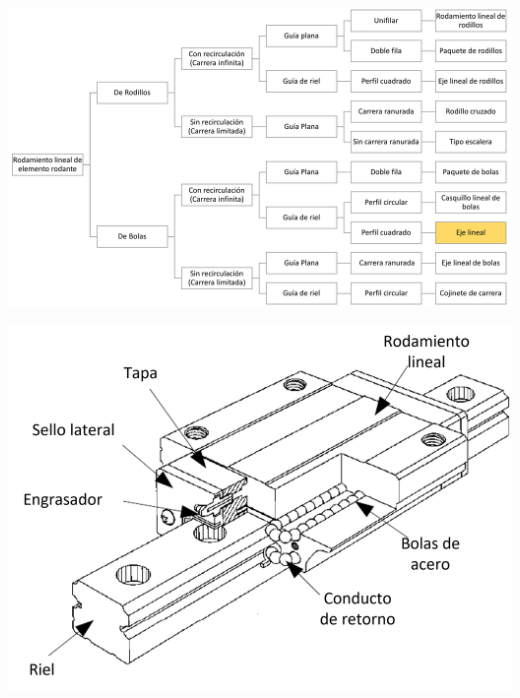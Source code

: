 \begin{center}
    \includegraphics[scale=0.55]{imagenes/diagrama de rodamientos lineales.png}
    \label{fig:diagrama_rodamientos}
\end{center}
\begin{center}
    \includegraphics[scale=0.55]{imagenes/Eje_lineal.png}
    \label{fig:eje_lineal}
\end{center}

